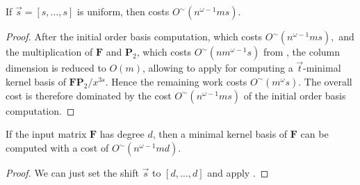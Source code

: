 \begin{thm}
\label{thm:costOfMinimalNullspaceBasisWithUniformShift}If $\vec{s}=\left[s,\dots,s\right]$
is uniform, then 
costs $O^{\sim}\left(n^{\omega-1}ms\right)$. \end{thm}
\begin{proof}
After the initial order basis computation, which costs $O^{\sim}\left(n^{\omega-1}ms\right),$
and the multiplication of $\mathbf{F}$ and $\mathbf{P}_{2}$, which
costs $O^{\sim}\left(nm^{\omega-1}s\right)$ from ,
the column dimension is reduced to $O\left(m\right)$, allowing 
to apply for computing a $\vec{t}$-minimal kernel basis of $\mathbf{F}\mathbf{P}_{2}/x^{3s}$.
Hence the remaining work costs $O^{\sim}\left(m^{\omega}s\right)$.
The overall cost is therefore dominated by the cost $O^{\sim}\left(n^{\omega-1}ms\right)$
of the initial order basis computation.\end{proof}
\begin{cor}
\label{cor:costOfMinimalNullspaceBasis}If the input matrix $\mathbf{F}$
has degree $d$, then a minimal kernel basis of $\mathbf{F}$ can
be computed with a cost of $O^{\sim}\left(n^{\omega-1}md\right)$. \end{cor}
\begin{proof}
We can just set the shift $\vec{s}$ to $\left[d,\dots,d\right]$
and apply .
\end{proof}

